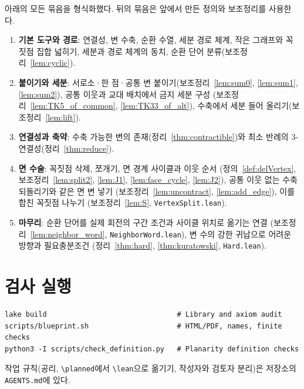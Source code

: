 아래의 모든 묶음을 형식화했다. 뒤의 묶음은 앞에서 만든 정의와 보조정리를 사용한다.
\begin{enumerate}
  \item \textbf{기본 도구와 경로}: 연결성, 변 수축, 순환 수열, 세분 경로 체계,
        작은 그래프와 꼭짓점 집합 넓히기, 세분과 경로 체계의 동치,
        순환 단어 분류(보조정리~\ref{lem:cyclic}).
  \item \textbf{붙이기와 세분}: 서로소·한 점·공통 변 붙이기(보조정리~\ref{lem:sum0},
        \ref{lem:sum1}, \ref{lem:sum2}), 공통 이웃과 교대 배치에서 금지 세분 구성
        (보조정리~\ref{lem:TK5_of_common}, \ref{lem:TK33_of_alt}),
        수축에서 세분 들어 올리기(보조정리~\ref{lem:lift}).
  \item \textbf{연결성과 축약}: 수축 가능한 변의 존재(정리~\ref{thm:contractible})와
        최소 반례의 3-연결성(정리~\ref{thm:reduce}).
  \item \textbf{면 수술}: 꼭짓점 삭제, 쪼개기, 면 경계 사이클과 이웃 순서
        (정의~\ref{def:delVertex}, 보조정리~\ref{lem:split2}, \ref{lem:J1},
        \ref{lem:face_cycle}, \ref{lem:J2}), 공통 이웃 없는 수축 되돌리기와 같은 면 변 넣기
        (보조정리~\ref{lem:uncontract}, \ref{lem:add_edge}), 이를 합친 꼭짓점 나누기
        (보조정리~\ref{lem:S}, \texttt{VertexSplit.lean}).
  \item \textbf{마무리}: 순환 단어를 실제 회전의 구간 조건과 사이클 위치로 옮기는 연결
        (보조정리~\ref{lem:neighbor_word}, \texttt{NeighborWord.lean}),
        변 수의 강한 귀납으로 어려운 방향과 필요충분조건
        (정리~\ref{thm:hard}, \ref{thm:kuratowski}, \texttt{Hard.lean}).
\end{enumerate}

\section{검사 실행}

\begin{verbatim}
lake build                               # Library and axiom audit
scripts/blueprint.sh                     # HTML/PDF, names, finite checks
python3 -I scripts/check_definition.py   # Planarity definition checks
\end{verbatim}
작업 규칙(공리, \texttt{\textbackslash planned}에서 \texttt{\textbackslash lean}으로 옮기기, 작성자와
검토자 분리)은 저장소의
\texttt{AGENTS.md}에 있다.
